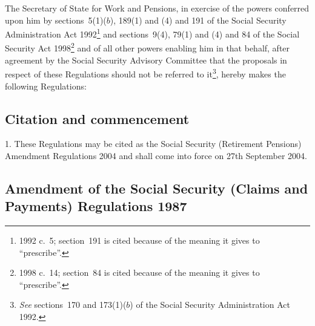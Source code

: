 \documentclass[12pt,a4paper]{article}
\title{\regstitle}
\author{S.I.\ 2004 No.\ 2283}
\date{Made
2nd September 2004\\
Laid before Parliament
6th September 2004\\
Coming into~force
27th September 2004
}
\begin{document}
\maketitle

\noindent
The Secretary of State for Work and Pensions, in exercise of the powers conferred upon him by sections~5(1)($b$), 189(1) and (4) and 191 of the Social Security Administration Act 1992\footnote{1992 c.~5; section~191 is cited because of the meaning it gives to “prescribe”.} and sections~9(4), 79(1) and (4) and 84 of the Social Security Act 1998\footnote{1998 c.~14; section~84 is cited because of the meaning it gives to “prescribe”.} and of all other powers enabling him in that behalf, after agreement by the Social Security Advisory Committee that the proposals in respect of these Regulations should not be referred to it\footnote{\emph{See} sections~170 and 173(1)($b$)  of the Social Security Administration Act 1992.}, hereby makes the following Regulations: 

{\sloppy

\tableofcontents

}

\bigskip

\setcounter{secnumdepth}{-2}

\subsection[1. Citation and commencement]{Citation and commencement}

1.  These Regulations may be cited as the Social Security (Retirement Pensions) Amendment Regulations 2004 and shall come into force on 27th September 2004.

\subsection[2. Amendment of the Social Security (Claims and Payments) Regulations 1987]{Amendment of the Social Security (Claims and Payments) Regulations 1987}
\end{document}
